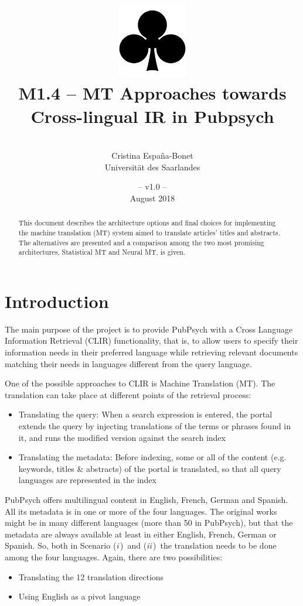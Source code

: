 \documentclass[a4paper,11pt]{article}
\title{
\includegraphics[width=3cm]{./img/200px-SuitClubs.png} \\
\Huge M1.4 -- MT Approaches towards Cross-lingual IR in Pubpsych}
\author{\vspace*{1cm}\\ \LARGE Cristina Espa\~na-Bonet \medskip \\ \Large Universit\"at des Saarlandes}
\date{\vspace*{2cm} -- v1.0 --\\August 2018}
\newcommand{\Ni}{({\em i\,})~}
\newcommand{\Nii}{({\em ii\,})~}
\begin{document}
\clearpage\maketitle
\thispagestyle{empty}\thispagestyle{empty}

\vspace*{5cm}
\begin{abstract}
This document describes the architecture options and final choices for implementing the machine translation (MT) system aimed to translate articles' titles and abstracts. The alternatives are presented and a comparison among the two most promising architectures, Statistical MT and Neural MT, is given. 
\end{abstract}

\newpage
\tableofcontents
\clearpage

\section{Introduction}
\label{s:intro}

The main purpose of the project is to provide PubPsych with a Cross Language Information Retrieval (CLIR) functionality, that is, to allow users to specify their information needs in their preferred language while retrieving relevant documents matching their needs in languages different from the query language.

One of the possible approaches to CLIR is Machine Translation (MT). The translation can take place at different points of the retrieval process:
\begin{itemize}
\itemsep0em 
 \item[\Ni] Translating the query: When a search expression is entered, the portal extends the query by injecting translations of the terms or phrases found in it, and runs the modified version against the search index
 \item[\Nii] Translating the metadata: Before indexing, some or all of the content (e.g. keywords, titles \& abstracts) of the portal is translated, so that all query languages are represented in the index
\end{itemize}

PubPsych offers multilingual content in English, French, German and Spanish. All its metadata is in one or more of the four languages. The original works might be in many different languages (more than 50 in PubPsych), but that the metadata are always available at least in either English, French, German or Spanish. So, both in Scenario \Ni and \Nii the translation needs to be done among the four languages. Again, there are two possibilities:
\begin{itemize}
\itemsep0em 
 \item[\Ni] Translating the 12 translation directions
 \item[\Nii] Using English as a pivot language
\end{itemize}
\end{document}
